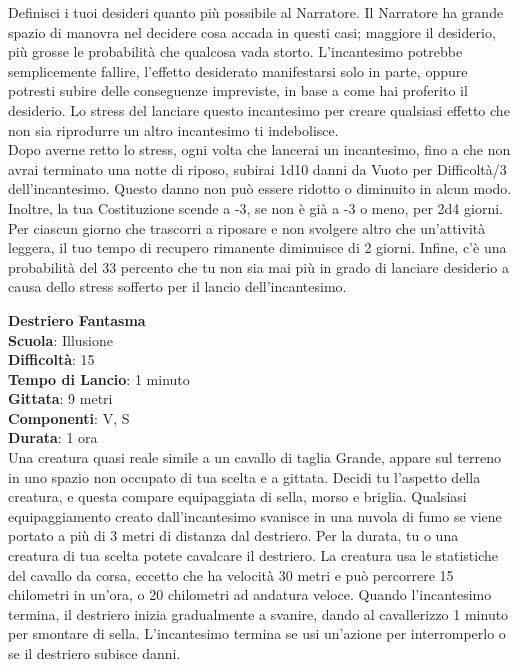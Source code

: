 \begin{multicols}{2}
\medskip
Definisci i tuoi desideri quanto più possibile al Narratore. Il Narratore ha grande spazio di
manovra nel decidere cosa accada in questi casi; maggiore il desiderio, più grosse le probabilità che qualcosa vada storto. L'incantesimo potrebbe semplicemente fallire, l'effetto desiderato manifestarsi solo in parte, oppure potresti subire delle conseguenze impreviste, in base a come hai proferito il desiderio. Lo stress del lanciare questo incantesimo per creare qualsiasi effetto che non sia riprodurre un altro incantesimo ti indebolisce.\\
Dopo averne retto lo stress, ogni volta che lancerai un incantesimo, fino a che non avrai terminato una notte di riposo, subirai 1d10 danni da Vuoto per Difficoltà/3 dell'incantesimo. Questo danno non può essere ridotto o diminuito in alcun modo. Inoltre, la tua Costituzione scende a -3, se non è già a -3 o meno, per 2d4 giorni.\\
Per ciascun giorno che trascorri a riposare e non svolgere altro che un'attività leggera, il tuo tempo di recupero rimanente diminuisce di 2 giorni. Infine, c'è una probabilità del 33 percento che tu non sia mai più in grado di lanciare desiderio a causa dello stress sofferto per il lancio dell'incantesimo.

\medskip\textbf{Destriero Fantasma}\\
\textbf{Scuola}: Illusione\\
\textbf{Difficoltà}: 15\\
\textbf{Tempo di Lancio}: 1 minuto\\
\textbf{Gittata}: 9 metri\\
\textbf{Componenti}: V, S\\
\textbf{Durata}: 1 ora\\
Una creatura quasi reale simile a un cavallo di taglia Grande, appare sul terreno in uno spazio non occupato di tua scelta e a gittata. Decidi tu l'aspetto della creatura, e questa compare equipaggiata di sella, morso e briglia. Qualsiasi equipaggiamento creato dall'incantesimo svanisce in una nuvola di fumo se viene portato a più di 3 metri di distanza dal destriero. Per la durata, tu o una creatura di tua scelta potete cavalcare il destriero. La creatura usa le statistiche del cavallo da corsa, eccetto che ha velocità 30 metri e può percorrere 15 chilometri in un'ora, o 20 chilometri ad andatura veloce. Quando l'incantesimo termina, il destriero inizia gradualmente a svanire, dando al cavallerizzo 1 minuto per smontare di sella. L'incantesimo termina se usi un'azione per interromperlo o se il destriero subisce danni.


\end{multicols}
